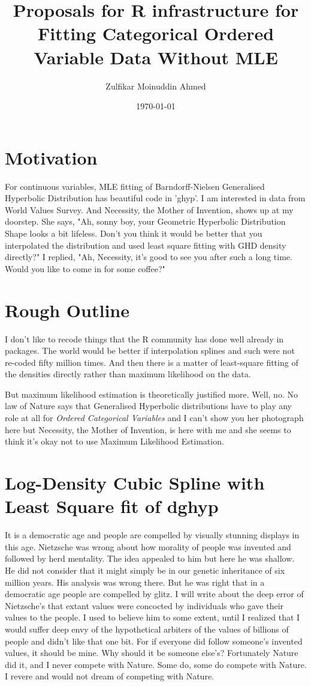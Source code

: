 \documentclass{amsart}
\title{Proposals for R infrastructure for Fitting Categorical Ordered Variable Data Without MLE}
\author{Zulfikar Moinuddin Ahmed}
\date{\today}
\begin{document}
\maketitle

\section{Motivation}

For continuous variables, MLE fitting of Barndorff-Nielsen Generalised Hyperbolic Distribution has beautiful code in 'ghyp'.  I am interested in data from World Values Survey.  And Necessity, the Mother of Invention, shows up at my doorstep.  She says, "Ah, sonny boy, your Geometric Hyperbolic Distribution Shape looks a bit lifeless.  Don't you think it would be better that you interpolated the distribution and used least square fitting with GHD density directly?"
I replied, "Ah, Necessity, it's good to see you after such a long time.  Would you like to come in for some coffee?"

\section{Rough Outline}

I don't like to recode things that the R community has done well already in packages.  The world would be better if interpolation splines and such were not re-coded fifty million times.  And then there is a matter of least-square fitting of the densities directly rather than maximum likelihood on the data.  

But maximum likelihood estimation is theoretically justified more.  Well, no.  No law of Nature says that Generalised Hyperbolic distributions have to play any role at all for {\em Ordered Categorical Variables} and I can't show you her photograph here but Necessity, the Mother of Invention, is here with me and she seems to think it's okay not to use Maximum Likelihood Estimation.

\section{Log-Density Cubic Spline with Least Square fit of dghyp}

It is a democratic age and people are compelled by visually stunning displays in this age.  Nietzsche was wrong about how morality of people was invented and followed by herd mentality.  The idea appealed to him but here he was shallow.  He did not consider that it might simply be in our genetic inheritance of six million years.  His analysis was wrong there.  But he was right that in a democratic age people are compelled by glitz.  I will write about the deep error of Nietzsche's that extant values were concocted by individuals who gave their values to the people.  I used to believe him to some extent, until I realized that I would suffer deep envy of the hypothetical arbiters of the values of billions of people and didn't like that one bit.  For if everyone did follow someone's invented values, it should be mine.  Why should it be someone else's?  Fortunately Nature did it, and I never compete with Nature.  Some do, some do compete with Nature.  I revere and would not dream of competing with Nature.
\end{document}
